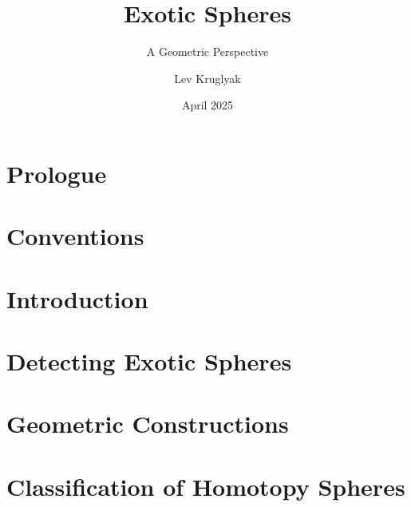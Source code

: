 \documentclass{lkx_thesis}
\title{Exotic Spheres}
\subtitle{A Geometric Perspective}
\author{Lev Kruglyak}
\date{April 2025}
\begin{document}


\lkxtoc

\chapter*{Prologue}\label{chap:prologue}


\chapter*{Conventions}\label{chap:conventions}


\chapter{Introduction}\label{chap:introduction}


\chapter{Detecting Exotic Spheres}\label{chap:detection}


\chapter{Geometric Constructions}\label{chap:construction}


\chapter{Classification of Homotopy Spheres}\label{chap:classification}

\end{document}
